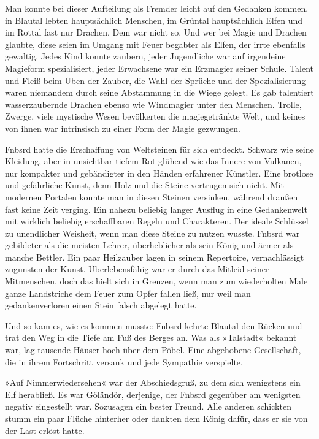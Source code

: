 Man konnte bei dieser Aufteilung als Fremder leicht auf den Gedanken kommen, in Blautal lebten hauptsächlich Menschen, im Grüntal hauptsächlich Elfen und im Rottal fast nur Drachen. Dem war nicht so. Und wer bei Magie und Drachen glaubte, diese seien im Umgang mit Feuer begabter als Elfen, der irrte ebenfalls gewaltig. Jedes Kind konnte zaubern, jeder Jugendliche war auf irgendeine Magieform spezialisiert, jeder Erwachsene war ein Erzmagier seiner Schule. Talent und Fleiß beim Üben der Zauber, die Wahl der Sprüche und der Spezialisierung waren niemandem durch seine Abstammung in die Wiege gelegt. Es gab talentiert wasserzaubernde Drachen ebenso wie Windmagier unter den Menschen. Trolle, Zwerge, viele mystische Wesen bevölkerten die magiegetränkte Welt, und keines von ihnen war intrinsisch zu einer Form der Magie gezwungen.

Fnbsrd hatte die Erschaffung von Weltsteinen für sich entdeckt. Schwarz wie seine Kleidung, aber in unsichtbar tiefem Rot glühend wie das Innere von Vulkanen, nur kompakter und gebändigter in den Händen erfahrener Künstler. Eine brotlose und gefährliche Kunst, denn Holz und die Steine vertrugen sich nicht. Mit modernen Portalen konnte man in diesen Steinen versinken, während draußen fast keine Zeit verging. Ein nahezu beliebig langer Ausflug in eine Gedankenwelt mit wirklich beliebig erschaffbaren Regeln und Charakteren. Der ideale Schlüssel zu unendlicher Weisheit, wenn man diese Steine zu nutzen wusste. Fnbsrd war gebildeter als die meisten Lehrer, überheblicher als sein König und ärmer als manche Bettler. Ein paar Heilzauber lagen in seinem Repertoire, vernachlässigt zugunsten der Kunst. Überlebensfähig war er durch das Mitleid seiner Mitmenschen, doch das hielt sich in Grenzen, wenn man zum wiederholten Male ganze Landstriche dem Feuer zum Opfer fallen ließ, nur weil man gedankenverloren einen Stein falsch abgelegt hatte.

Und so kam es, wie es kommen musste: Fnbsrd kehrte Blautal den Rücken und trat den Weg in die Tiefe am Fuß des Berges an. Was als »Talstadt« bekannt war, lag tausende Häuser hoch über dem Pöbel. Eine abgehobene Gesellschaft, die in ihrem Fortschritt versank und jede Sympathie verspielte.

»Auf Nimmerwiedersehen« war der Abschiedsgruß, zu dem sich wenigstens ein Elf herabließ. Es war Göländör, derjenige, der Fnbsrd gegenüber am wenigsten negativ eingestellt war. Sozusagen ein bester Freund. Alle anderen schickten stumm ein paar Flüche hinterher oder dankten dem König dafür, dass er sie von der Last erlöst hatte.

